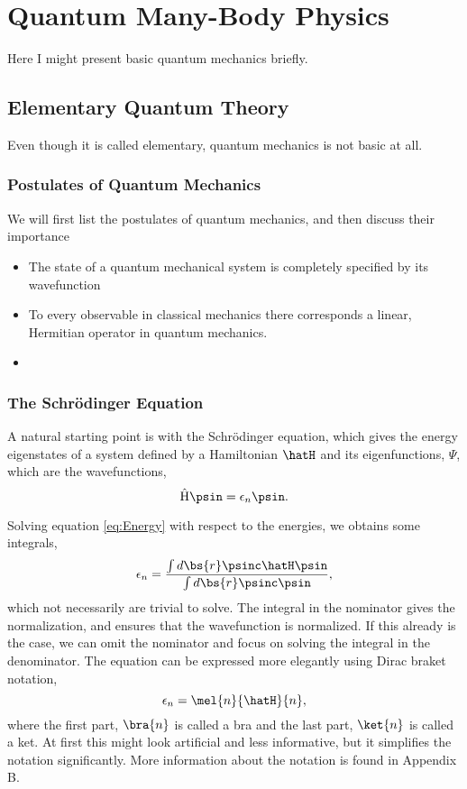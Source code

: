 \section{Quantum Many-Body Physics} \label{sec:quantum}
Here I might present basic quantum mechanics briefly.

\subsection{Elementary Quantum Theory} \label{subsec:elementary}
Even though it is called elementary, quantum mechanics is not basic at all. 
\subsubsection{Postulates of Quantum Mechanics} \label{subsubsec:postulates}
We will first list the postulates of quantum mechanics, and then discuss their importance
\begin{itemize}
	\item The state of a quantum mechanical system is completely specified by its wavefunction
	\item To every observable in classical mechanics there corresponds a linear, Hermitian operator in quantum mechanics. 
	\item 
\end{itemize}

\subsubsection{The Schrödinger Equation} \label{subsubsec:schrodinger}
A natural starting point is with the Schrödinger equation, which gives the energy eigenstates of a system defined by a Hamiltonian $\hatH$ and its eigenfunctions, $\Psi$, which are the wavefunctions,
\begin{equation}
\label{eq:Energy}
\hat{\text{H}}\psin=\epsilon_n\psin.
\end{equation}

Solving equation \eqref{eq:Energy} with respect to the energies, we obtains some integrals,
\begin{equation}
\epsilon_n=\frac{\int d\bs{r}\psinc\hatH\psin}{\int d\bs{r}\psinc\psin},
\end{equation}
which not necessarily are trivial to solve. The integral in the nominator gives the normalization, and ensures that the wavefunction is normalized. If this already is the case, we can omit the nominator and focus on solving the integral in the denominator. The equation can be expressed more elegantly using Dirac braket notation,
\begin{equation}
\epsilon_n=\mel{n}{\hatH}{n},
\end{equation}
where the first part, $\bra{n}$ is called a bra and the last part, $\ket{n}$ is called a ket. At first this might look artificial and less informative, but it simplifies the notation significantly. More information about the notation is found in Appendix B. 
\cite{GriffQuan}

